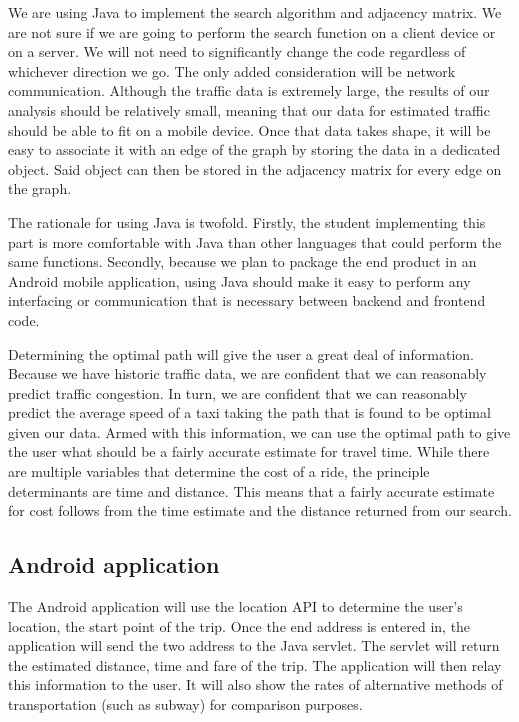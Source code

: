 \documentclass{sig-alternate}
\begin{document}
We are using Java to implement the search algorithm and adjacency matrix.  We are not sure if we are going to perform the search function on a client device or on a server.  We will not need to significantly change the code regardless of whichever direction we go.  The only added consideration will be network communication.  Although the traffic data is extremely large, the results of our analysis should be relatively small, meaning that our data for estimated traffic should be able to fit on a mobile device.  Once that data takes shape, it will be easy to associate it with an edge of the graph by storing the data in a dedicated object.  Said object can then be stored in the adjacency matrix for every edge on the graph.

The rationale for using Java is twofold.  Firstly, the student implementing this part is more comfortable with Java than other languages that could perform the same functions.  Secondly, because we plan to package the end product in an Android mobile application, using Java should make it easy to perform any interfacing or communication that is necessary between backend and frontend code.

Determining the optimal path will give the user a great deal of information.  Because we have historic traffic data, we are confident that we can reasonably predict traffic congestion.  In turn, we are confident that we can reasonably predict the average speed of a taxi taking the path that is found to be optimal given our data.  Armed with this information, we can use the optimal path to give the user what should be a fairly accurate estimate for travel time.  While there are multiple variables that determine the cost of a ride, the principle determinants are time and distance.  This means that a fairly accurate estimate for cost follows from the time estimate and the distance returned from our search.


\subsection{Android application}
The Android application will use the location API to determine the user's location, the start point of the trip. Once the end address is entered in, the application will send the two address to the Java servlet. The servlet will return the estimated distance, time and fare of the trip. The application will then relay this information to the user. It will also show the rates of alternative methods of transportation (such as subway) for comparison purposes.
\end{document}

